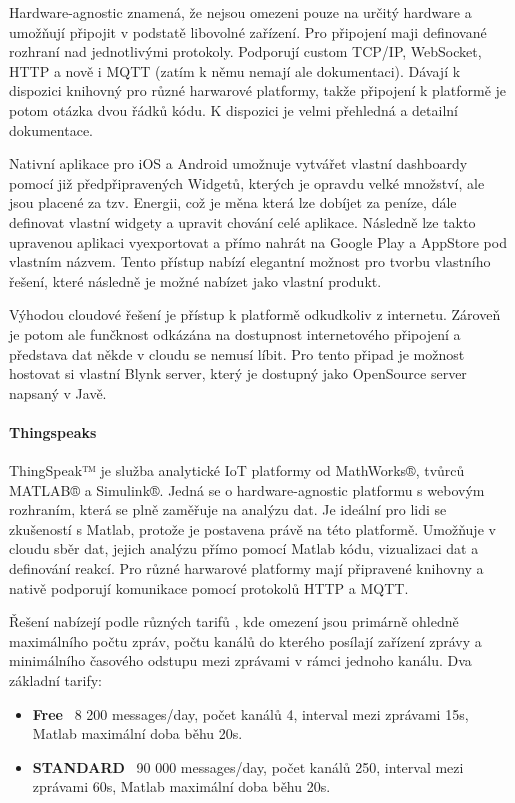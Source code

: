 Hardware-agnostic znamená, že nejsou omezeni pouze na určitý hardware a umožňují připojit v podstatě libovolné zařízení. Pro připojení maji definované rozhraní nad jednotlivými protokoly. Podporují custom TCP/IP, WebSocket, HTTP a nově i MQTT (zatím k němu nemají ale dokumentaci). Dávají k dispozici knihovný pro různé harwarové platformy, takže připojení k platformě je potom otázka dvou řádků kódu. K dispozici je velmi přehledná a detailní dokumentace.\cite{blynk-doc}

Nativní aplikace pro iOS a Android umožnuje vytvářet vlastní dashboardy pomocí již předpřipravených Widgetů, kterých je opravdu velké množství, ale jsou placené za tzv. Energii, což je měna která lze dobíjet za peníze, dále definovat vlastní widgety a upravit chování celé aplikace. Následně lze takto upravenou aplikaci vyexportovat a přímo nahrát na Google Play a AppStore pod vlastním názvem. Tento přístup nabízí elegantní možnost pro tvorbu vlastního řešení, které následně je možné nabízet jako vlastní produkt.\cite{blynk}

Výhodou cloudové řešení je přístup k platformě odkudkoliv z internetu. Zároveň je potom ale funčknost odkázána na dostupnost internetového připojení a představa dat někde v cloudu se nemusí líbit. Pro tento připad je možnost hostovat si vlastní Blynk server, který je dostupný jako OpenSource server napsaný v Javě. \cite{blynk-server}

\paragraph{Thingspeaks}
ThingSpeak™ je služba analytické IoT platformy od MathWorks®, tvůrců MATLAB® a Simulink®. Jedná se o hardware-agnostic platformu s webovým rozhraním, která se plně zaměřuje na analýzu dat. Je ideální pro lidi se zkušeností s Matlab, protože je postavena právě na této platformě. Umožňuje v cloudu sběr dat, jejich analýzu přímo pomocí Matlab kódu, vizualizaci dat a definování reakcí. Pro různé harwarové platformy mají připravené knihovny a nativě podporují komunikace pomocí protokolů HTTP a MQTT. \cite{thingspeaks}

Řešení nabízejí podle různých tarifů \cite{thingspeaks-pricing}, kde omezení jsou primárně ohledně maximálního počtu zpráv, počtu kanálů do kterého posílají zařízení zprávy a minimálního časového odstupu mezi zprávami v rámci jednoho kanálu. Dva základní tarify:
\begin{itemize}
    \item \textbf{Free} ~8 200 messages/day, počet kanálů 4, interval mezi zprávami 15s, Matlab maximální doba běhu 20s.
    \item \textbf{STANDARD} ~90 000 messages/day, počet kanálů 250, interval mezi zprávami 60s, Matlab maximální doba běhu 20s.
\end{itemize}

